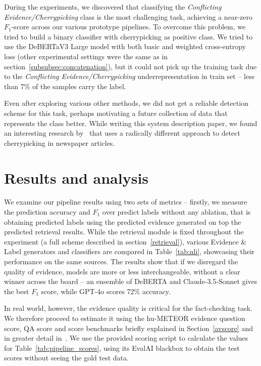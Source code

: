 During the experiments, we discovered that classifying the \textit{Conflicting Evidence/Cherrypicking} class is the most challenging task, achieving a near-zero $F_1$-score across our various prototype pipelines.
To overcome this problem, we tried to build a binary classifier with cherrypicking as positive class. We tried to use the DeBERTaV3 Large model with both basic and weighted cross-entropy loss (other experimental settings were the same as in section~\ref{subsubsec:concatenation}), but it could not pick up the training task due to the \textit{Conflicting Evidence/Cherrypicking} underrepresentation in train set -- less than 7\% of the samples carry the label. 

Even after exploring various other methods, we did not get a reliable detection scheme for this task, perhaps motivating a future collection of data that represents the class better.
While writing this system description paper, we found an interesting research by~\citet{jaradat2024contextawaredetectioncherrypickingnews} that uses a radically different approach to detect cherrypicking in newspaper articles.


\section{Results and analysis}
\label{sec:results}

We examine our pipeline results using two sets of metrics -- firstly, we measure the prediction accuracy and $F_1$ over predict labels without any ablation, that is obtaining predicted labels using the predicted evidence generated on top the predicted retrieval results. 
While the retrieval module is fixed throughout the experiment (a full scheme described in section~\ref{retrieval}), various Evidence \& Label generators and classifiers are compared in Table~\ref{tab:nli}, showcasing their performance on the same sources.
The results show that if we disregard the quality of evidence, models are more or less interchangeable, without a clear winner across the board -- an ensemble of DeBERTA and Claude-3.5-Sonnet gives the best $F_1$ score, while GPT-4o scores 72\% accuracy.
\begin{table}\end{table}
\begin{table}\end{table}

In real world, however, the evidence quality is critical for the fact-checking task.
We therefore proceed to estimate it using the hu-METEOR evidence question score, QA score and \averitec{} score benchmarks briefly explained in Section~\ref{avscore} and in greater detail in~\cite{averitec2024}.
We use the provided \averitec{} scoring script to calculate the values for Table~\ref{tab:pipeline_scores}, using its EvalAI blackbox to obtain the test scores without seeing the gold test data.

